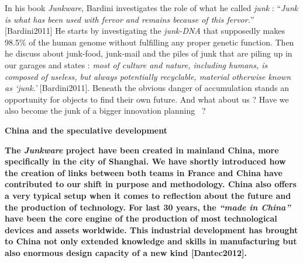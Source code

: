\bigskip

In his book \textit{Junkware},\textit{ }Bardini investigates the role of
what he called \textit{j}\textit{unk} : {\textquotedblleft}\textit{Junk
is what has been used with fervor and remains because of this
fervor.}{\textquotedblright} [Bardini2011] He starts by investigating
the \textit{junk-}\textit{DNA} that supposedly makes 98.5\% of the
human genome without fulfilling any proper genetic function. Then he
discuss about junk-food, junk-mail and the piles of junk that are
piling up in our garages and states : \textit{{\textquotedbl}most of
culture and nature, including humans, is composed of useless, but
always potentially recyclable, material otherwise known as
{\textquoteleft}junk.{\textquoteright} {\textquotedbl} }[Bardini2011].
Beneath the obvious danger of accumulation stands an opportunity for
objects to find their own future. And what about us ? Have we also
become the junk of a bigger innovation planning \ ?


\bigskip

{\bfseries
China and the speculative development }

{\bfseries
\textmd{The }\textmd{\textit{Junkware}}\textmd{ }\textmd{project
}\textmd{ha}\textmd{ve}\textmd{ been }\textmd{created }\textmd{in
mainland China}\textmd{, more specifically in }\textmd{the city of
}\textmd{Shanghai}\textmd{. }\textmd{We have shortly introduced how
th}\textmd{e creation of link}\textmd{s}\textmd{ between }\textmd{both
teams in }\textmd{France and Chin}\textmd{a}\textmd{ }\textmd{have
contributed to }\textmd{our shift in purpose and methodology.
}\textmd{China }\textmd{also }\textmd{offers a very typical
}\textmd{setup when it comes }\textmd{to reflection about }\textmd{the
}\textmd{future }\textmd{and the production of }\textmd{technology.
}\textmd{For last 30 years, }\textmd{the
}\textmd{\textit{{\textquotedblleft}made in China{\textquotedblright}
}}\textmd{ha}\textmd{ve}\textmd{ }\textmd{b}\textmd{een }\textmd{the
}\textmd{core }\textmd{engine }\textmd{of }\textmd{the production of
}\textmd{most }\textmd{technolog}\textmd{ical devices and assets
}\textmd{worldwide}\textmd{. }\textmd{This }\textmd{industrial
}\textmd{develop}\textmd{ment}\textmd{ }\textmd{has
br}\textmd{ou}\textmd{g}\textmd{ht}\textmd{ }\textmd{to }\textmd{China
}\textmd{not only }\textmd{extended}\textmd{ }\textmd{knowledge
}\textmd{and skills in }\textmd{manufacturing }\textmd{but also
}\textmd{enormous }\textmd{design }\textmd{capacity }\textmd{of a new
kind }\textmd{[}\textmd{Dantec2012}\textmd{]. }}


